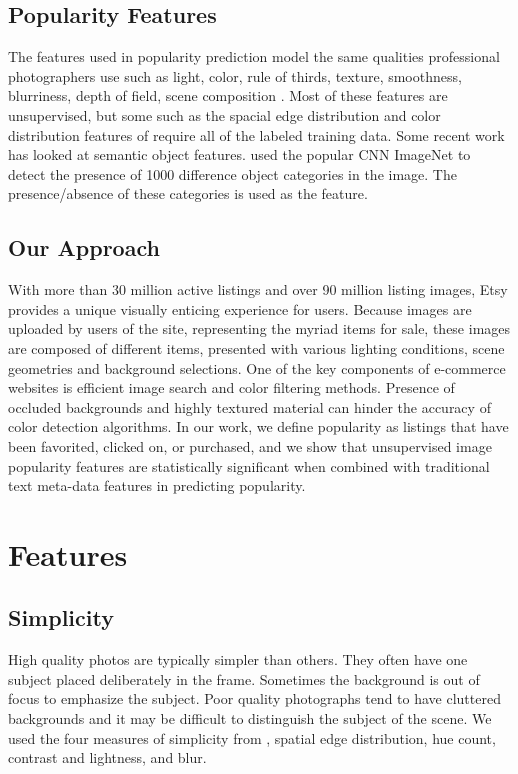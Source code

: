 \documentclass[conference,a4paper]{IEEEtran}
\begin{document}
\subsection{Popularity Features}
The features used in popularity prediction model the same qualities professional photographers use such as light, color, rule of thirds, texture, smoothness, blurriness, depth of field, scene composition \cite{ke2006design} \cite{datta2006studying} \cite{chen2014aesthetic} \cite{wang2015automatic}.  Most of these features are unsupervised, but some such as the spacial edge distribution and color distribution features of \cite{ke2006design} require all of the labeled training data.  Some recent work has looked at semantic object features.  \cite{khosla2014makes} used the popular CNN ImageNet to detect the presence of 1000 difference object categories in the image.  The presence/absence of these categories is used as the feature.

\subsection{Our Approach}
With more than 30 million active listings and over 90 million listing images, Etsy provides a unique visually enticing experience
for users. Because images are uploaded by users of the site,
representing the myriad items for sale, these images are composed of different items, presented with various
lighting conditions, scene geometries and background selections. One of
the key components of e-commerce websites is
efficient image search and color filtering methods. Presence of occluded backgrounds and highly
textured material can hinder the accuracy of color detection
algorithms.  In our work, we define popularity as listings that have been favorited, clicked on, or purchased, and we show that unsupervised image popularity features are statistically significant when combined with traditional text meta-data features in predicting popularity.

\section{Features}
\label{sec:features}
  \subsection{Simplicity}
  High quality photos are typically simpler than others.  They often have one subject placed deliberately in the frame.  Sometimes the background is out of focus to emphasize the subject.  Poor quality photographs tend to have cluttered backgrounds and it may be difficult to distinguish the subject of the scene.  We used the four measures of simplicity from \cite{ke2006design}, spatial edge distribution, hue count, contrast and lightness, and blur.
\end{document}
